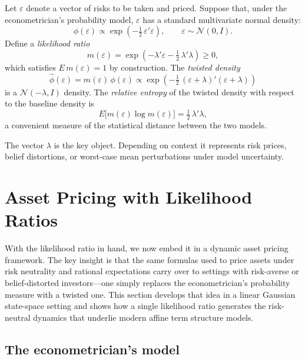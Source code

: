 \documentclass[12pt]{article}
\theoremstyle{definition}
\begin{document}
Let $\varepsilon$ denote a vector of risks to be taken and priced.
Suppose that, under the econometrician's probability model,
$\varepsilon$ has a standard multivariate normal density:
\[
   \phi(\varepsilon)  \propto \exp\!\left(- \tfrac{1}{2}\,
       \varepsilon' \varepsilon\right), \qquad
       \varepsilon \sim {\mathcal N}(0,I).
\]
Define a \emph{likelihood ratio}
\[
   m(\varepsilon)  = \exp \!\left( -\lambda' \varepsilon
       - \tfrac{1}{2}\, \lambda' \lambda \right) \geq 0,
\]
which satisfies $E\, m(\varepsilon) = 1$ by construction.  The
\emph{twisted density}
\[
   \hat \phi(\varepsilon)  =  m(\varepsilon)\, \phi(\varepsilon)
   \propto \exp\!\left( - \tfrac{1}{2}\,
       (\varepsilon + \lambda)'(\varepsilon + \lambda)\right)
\]
is a ${\mathcal N}(-\lambda, I)$ density.  The \emph{relative entropy}
of the twisted density with respect to the baseline density is
\[
   E\bigl[ m(\varepsilon) \log m(\varepsilon) \bigr]
       = \tfrac{1}{2}\, \lambda'\lambda,
\]
a convenient measure of the statistical distance between the two models.

The vector $\lambda$ is the key object.  Depending on context it
represents risk prices, belief distortions, or worst-case mean
perturbations under model uncertainty.


\section{Asset Pricing with Likelihood Ratios}
\label{sec:asset-pricing}

With the likelihood ratio in hand, we now embed it in a dynamic asset
pricing framework.  The key insight is that the same formulas used to
price assets under risk neutrality and rational expectations carry over
to settings with risk-averse or belief-distorted investors---one simply
replaces the econometrician's probability measure with a twisted one.
This section develops that idea in a linear Gaussian state-space setting
and shows how a single likelihood ratio generates the risk-neutral
dynamics that underlie modern affine term structure models.

\subsection{The econometrician's model}
\end{document}
